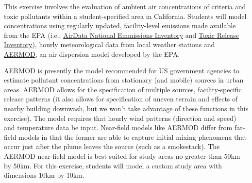 \documentclass[
  letterpaper,
  DIV=11,
  numbers=noendperiod]{scrartcl}
\begin{document}
This exercise involves the evaluation of ambient air concentrations of
criteria and toxic pollutants within a student-specified area in
California. Students will model concentrations using regularly updated,
facility-level emissions made available from the EPA (i.e.,
\href{https://www.epa.gov/air-emissions-inventories/national-emissions-inventory-nei}{AirData
National Emmissions Inventory} and
\href{https://www.epa.gov/toxics-release-inventory-tri-program}{Toxic
Release Inventory}), hourly meteorological data from local weather
stations and
\href{https://www.epa.gov/scram/air-quality-dispersion-modeling-preferred-and-recommended-models}{AERMOD},
an air dispersion model developed by the EPA.

AERMOD is presently the model recommended for US government agencies to
estimate pollutant concentrations from stationary (and mobile) sources
in urban areas. AERMOD allows for the specification of multiple sources,
facility-specific release patterns (it also allows for specification of
uneven terrain and effects of nearby building downwash, but we won't
take advantage of these functions in this exercise). The model requires
that hourly wind patterns (direction and speed) and temperature data be
input. Near-field models like AERMOD differ from far-field models in
that the former are able to capture initial mixing phenomena that occur
just after the plume leaves the source (such as a smokestack). The
AERMOD near-field model is best suited for study areas no greater than
50km by 50km. For this exercise, students will model a custom study area
with dimensions 10km by 10km.
\end{document}
